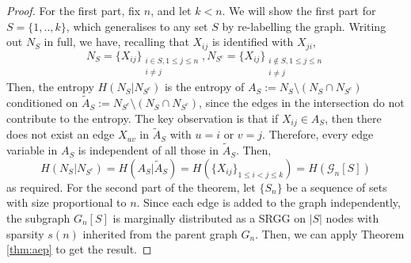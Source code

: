 \documentclass[conference,letterpaper]{IEEEtran}
\newcommand{\graph}{\mathcal{G}}
\begin{document}
\begin{proof}
    For the first part, fix $n$, and let $k < n$. We will show the first part for ${S} = \{1,..,k\}$,  which generalises to any set ${S}$ by re-labelling the graph. Writing out $N_{{S}}$ in full, we have, recalling that $X_{ij}$ is identified with $X_{ji}$,
    \begin{equation}
        N_{{S}} = \{X_{ij}\}_{\substack{i \in {S}, 1 \leq j \leq n\\
                                    i \neq j}}, N_{{S}^c} = \{X_{ij}\}_{\substack{i \notin {S}, 1 \leq j \leq n\\
                                    i \neq j}}
    \end{equation}
    Then, the entropy $H(N_{S}|N_{S^c
    })$ is the entropy of $A_{{S}} := N_{S} \setminus (N_{S} \cap N_{{S}^c})$ conditioned on $\widetilde{A}_{S} := N_{{S}^c} \setminus (N_{{S}} \cap N_{{S}^c})$, since the edges in the intersection do not contribute to the entropy. The key observation is that if $X_{ij} \in A_{S}$, then there does not exist an edge $X_{uv}$ in $\widetilde{A}_{S}$ with $u = i$ or $v = j$. Therefore, every edge variable in $A_{S}$ is independent of all those in $\widetilde{A}_{S}$. Then,
    \begin{equation*}
        H(N_S|N_{S^c}) = H(A_{S}|\widetilde{A}_{S}) = H(\{X_{ij}\}_{1\leq i<j \leq k}) = H(\graph_n[S])
    \end{equation*}
    as required. For the second part of the theorem, let $\{S_n\}$ be a sequence of sets with size proportional to $n$. Since each edge is added to the graph independently, the subgraph $G_n[S]$ is marginally distributed as a SRGG on $|S|$ nodes with sparsity $s(n)$ inherited from the parent graph $G_n$. Then, we can apply Theorem \ref{thm:aep} to get the result.
\end{proof}
\end{document}
